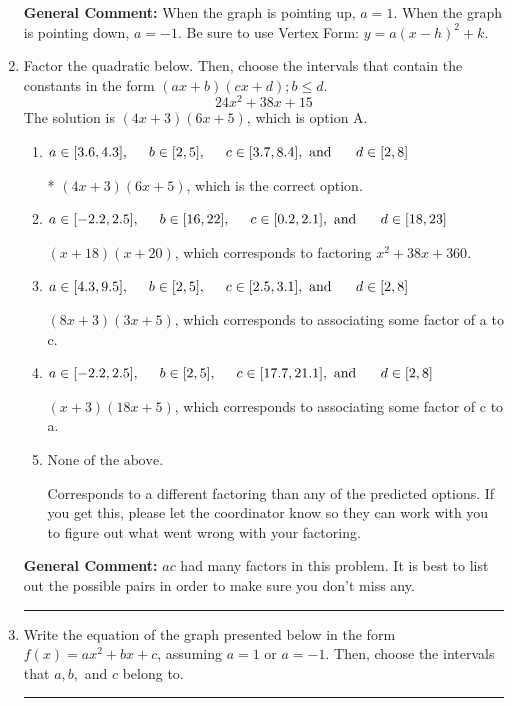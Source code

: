 \documentclass{extbook}[14pt]
\newcommand{\litem}[1]{\item #1

\rule{\textwidth}{0.4pt}}
\begin{document}
\begin{enumerate}
{\textbf{General Comment:} When the graph is pointing up, $a=1$. When the graph is pointing down, $a=-1$. Be sure to use Vertex Form: $y = a(x-h)^2+k$.
}
\litem{
Factor the quadratic below. Then, choose the intervals that contain the constants in the form $(ax+b)(cx+d); b \leq d.$
\[ 24x^{2} +38 x + 15 \]The solution is \( (4x + 3)(6x + 5) \), which is option A.\begin{enumerate}[label=\Alph*.]
\item \( a \in [3.6, 4.3], \hspace*{5mm} b \in [2, 5], \hspace*{5mm} c \in [3.7, 8.4], \text{ and } \hspace*{5mm} d \in [2, 8] \)

* $(4x + 3)(6x + 5)$, which is the correct option.
\item \( a \in [-2.2, 2.5], \hspace*{5mm} b \in [16, 22], \hspace*{5mm} c \in [0.2, 2.1], \text{ and } \hspace*{5mm} d \in [18, 23] \)

 $(x + 18)(x + 20)$, which corresponds to factoring $x^{2} +38 x + 360$.
\item \( a \in [4.3, 9.5], \hspace*{5mm} b \in [2, 5], \hspace*{5mm} c \in [2.5, 3.1], \text{ and } \hspace*{5mm} d \in [2, 8] \)

 $(8x + 3)(3x + 5)$, which corresponds to associating some factor of a to c.
\item \( a \in [-2.2, 2.5], \hspace*{5mm} b \in [2, 5], \hspace*{5mm} c \in [17.7, 21.1], \text{ and } \hspace*{5mm} d \in [2, 8] \)

 $(x + 3)(18x + 5)$, which corresponds to associating some factor of c to a.
\item \( \text{None of the above.} \)

 Corresponds to a different factoring than any of the predicted options. If you get this, please let the coordinator know so they can work with you to figure out what went wrong with your factoring.
\end{enumerate}

\textbf{General Comment:} $ac$ had many factors in this problem. It is best to list out the possible pairs in order to make sure you don't miss any.
}
\litem{
Write the equation of the graph presented below in the form $f(x)=ax^2+bx+c$, assuming  $a=1$ or $a=-1$. Then, choose the intervals that $a, b,$ and $c$ belong to.

}
\end{enumerate}
\end{document}
